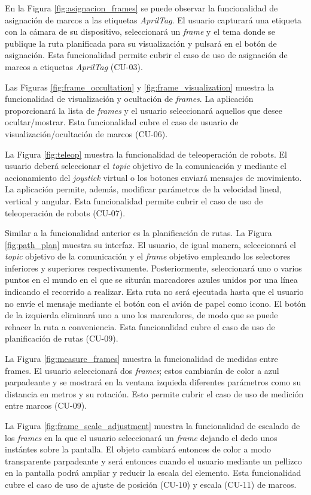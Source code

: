 En la Figura \ref{fig:asignacion_frames} se puede observar la funcionalidad de asignación de marcos a las etiquetas \textit{AprilTag}. 
El usuario capturará una etiqueta con la cámara de su dispositivo, seleccionará un \textit{frame} y el tema 
donde se publique la ruta planificada para su visualización y pulsará en el botón de asignación.
Esta funcionalidad permite cubrir el caso de uso de asignación de marcos a etiquetas \textit{AprilTag} (CU-03).

Las Figuras \ref{fig:frame_occultation} y \ref{fig:frame_visualization} muestra la funcionalidad de visualización y ocultación de \textit{frames}. 
La aplicación proporcionará la lista de \textit{frames} y el 
usuario seleccionará aquellos que desee ocultar/mostrar.
Esta funcionalidad cubre el caso de usuario de visualización/ocultación de marcos (CU-06).

La Figura \ref{fig:teleop} muestra la funcionalidad de teleoperación de robots. El usuario deberá seleccionar el \textit{topic} objetivo
de la comunicación y mediante el accionamiento del \textit{joystick} virtual o los botones enviará mensajes de movimiento.
La aplicación permite, además, modificar parámetros de la velocidad lineal, vertical y angular.
Esta funcionalidad permite cubrir el caso de uso de teleoperación de robots (CU-07).

Similar a la funcionalidad anterior es la planificación de rutas. La Figura \ref{fig:path_plan} muestra su interfaz. El usuario, de igual manera,
seleccionará el \textit{topic} objetivo de la comunicación y el \textit{frame} objetivo empleando los selectores inferiores y superiores respectivamente.
Posteriormente, seleccionará uno o varios puntos en el mundo en el que se siturán marcadores azules unidos por una línea indicando el recorrido a realizar.
Esta ruta no será ejecutada hasta que el usuario no envíe el mensaje mediante el botón con el avión de papel como icono. El botón de la izquierda eliminará uno a uno los 
marcadores, de modo que se puede rehacer la ruta a conveniencia. 
Esta funcionalidad cubre el caso de uso de planificación de rutas (CU-09).

La Figura \ref{fig:measure_frames} muestra la funcionalidad de medidas entre frames. El usuario seleccionará dos \textit{frames}; estos cambiarán de color a 
azul parpadeante y se mostrará en la ventana izquieda diferentes parámetros como su distancia en metros y su rotación. 
Esto permite cubrir el caso de uso de medición entre marcos (CU-09).

La Figura \ref{fig:frame_scale_adjustment} muestra la funcionalidad de escalado de los \textit{frames} en la que el usuario seleccionará un \textit{frame} 
dejando el dedo unos instántes sobre la pantalla. El objeto cambiará entonces de color a modo transparente parpadeante y será entonces cuando el 
usuario mediante un pellizco en la pantalla podrá ampliar y reducir la escala del elemento. 
Esta funcionalidad cubre el caso de uso de ajuste de posición (CU-10) y escala (CU-11) de marcos.

